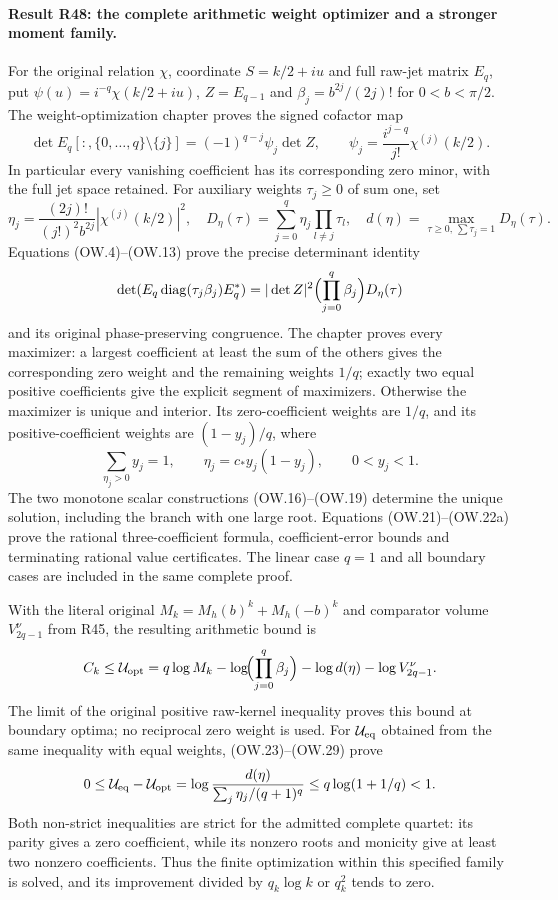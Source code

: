 \paragraph{Result R48: the complete arithmetic weight optimizer and a stronger moment family.}
For the original relation $\chi$, coordinate $S=k/2+iu$ and full
raw-jet matrix $E_q$, put $\psi(u)=i^{-q}\chi(k/2+iu)$,
$Z=E_{q-1}$ and $\beta_j=b^{2j}/(2j)!$ for $0<b<\pi/2$.
The weight-optimization chapter proves the signed cofactor map
\[
 \det E_q[:,\{0,\ldots,q\}\setminus\{j\}]
   =(-1)^{q-j}\psi_j\det Z,
 \qquad \psi_j=\frac{i^{j-q}}{j!}\chi^{(j)}(k/2).
\]
In particular every vanishing coefficient has its corresponding
zero minor, with the full jet space retained. For auxiliary weights
$\tau_j\ge0$ of sum one, set
\[
 \eta_j=\frac{(2j)!}{(j!)^2b^{2j}}|\chi^{(j)}(k/2)|^2,
 \quad D_\eta(\tau)=\sum_{j=0}^q\eta_j\prod_{l\ne j}\tau_l,
 \quad d(\eta)=\max_{\tau\ge0,\,\sum\tau_j=1}D_\eta(\tau).
\]
Equations (OW.4)--(OW.13) prove the precise determinant identity
\[
 \det(E_q\operatorname{diag}(\tau_j\beta_j)E_q^*)
 =|\det Z|^2\Bigl(\prod_{j=0}^q\beta_j\Bigr)D_\eta(\tau)
\]
and its original phase-preserving congruence. The chapter proves
every maximizer: a largest coefficient at least the sum of the
others gives the corresponding zero weight and the remaining
weights $1/q$; exactly two equal positive coefficients give the
explicit segment of maximizers. Otherwise the maximizer is unique
and interior. Its zero-coefficient weights are $1/q$, and its
positive-coefficient weights are $(1-y_j)/q$, where
\[
 \sum_{\eta_j>0}y_j=1,\qquad
 \eta_j=c_*y_j(1-y_j),\qquad 0<y_j<1.
\]
The two monotone scalar constructions (OW.16)--(OW.19) determine
the unique solution, including the branch with one large root.
Equations (OW.21)--(OW.22a) prove the rational three-coefficient
formula, coefficient-error bounds and terminating rational value
certificates. The linear case $q=1$ and all boundary cases are
included in the same complete proof.

With the literal original $M_k=M_h(b)^k+M_h(-b)^k$ and comparator
volume $V_{2q-1}^{\nu}$ from R45, the resulting arithmetic bound is
\[
 C_k\le\mathcal U_{\rm opt}
   =q\log M_k-\log\!\Bigl(\prod_{j=0}^q\beta_j\Bigr)
      -\log d(\eta)-\log V_{2q-1}^{\nu}.
\]
The limit of the original positive raw-kernel inequality proves
this bound at boundary optima; no reciprocal zero weight is used.
For $\mathcal U_{\rm eq}$ obtained from the same inequality with
equal weights, (OW.23)--(OW.29) prove
\[
 0\le\mathcal U_{\rm eq}-\mathcal U_{\rm opt}
   =\log\frac{d(\eta)}{\sum_j\eta_j/(q+1)^q}
   \le q\log(1+1/q)<1.
\]
Both non-strict inequalities are strict for the admitted complete
quartet: its parity gives a zero coefficient, while its nonzero
roots and monicity give at least two nonzero coefficients. Thus
the finite optimization within this specified family is solved,
and its improvement divided by $q_k\log k$ or $q_k^2$ tends to zero.

